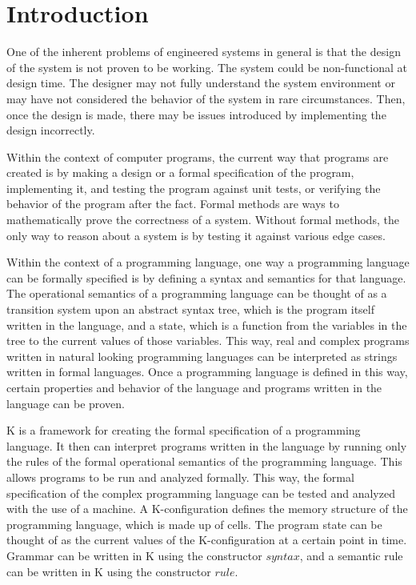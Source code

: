 \chapter{Introduction}
One of the inherent problems of engineered systems in general is that the design of the system is not proven to be working. The system could be non-functional at design time. The designer may not fully understand the system environment or may have not considered the behavior of the system in rare circumstances. Then, once the design is made, there may be issues introduced by implementing the design incorrectly.

Within the context of computer programs, the current way that programs are created is by making a design or a formal specification of the program, implementing it, and testing the program against unit tests, or verifying the behavior of the program after the fact.
Formal methods are ways to mathematically prove the correctness of a system. Without formal methods, the only way to reason about a system is by testing it against various edge cases.

Within the context of a programming language, one way a programming language can be formally specified is by defining a syntax and semantics for that language.
The operational semantics of a programming language can be thought of as a transition system upon an abstract syntax tree, which is the program itself written in the language, and a state, which is a function from the variables in the tree to the current values of those variables. 
This way, real and complex programs written in natural looking programming languages can be interpreted as strings written in formal languages. Once a programming language is defined in this way, certain properties and behavior of the language and programs written in the language can be proven.

K is a framework for creating the formal specification of a programming language. It then can interpret programs written in the language by running only the rules of the formal operational semantics of the programming language. This allows programs to be run and analyzed formally. This way, the formal specification of the complex programming language can be tested and analyzed with the use of a machine.
A K-configuration defines the memory structure of the programming language, which is made up of cells. The program state can be thought of as the current values of the K-configuration at a certain point in time.
Grammar can be written in K using the constructor $syntax$, and a semantic rule can be written in K using the constructor $rule$.

